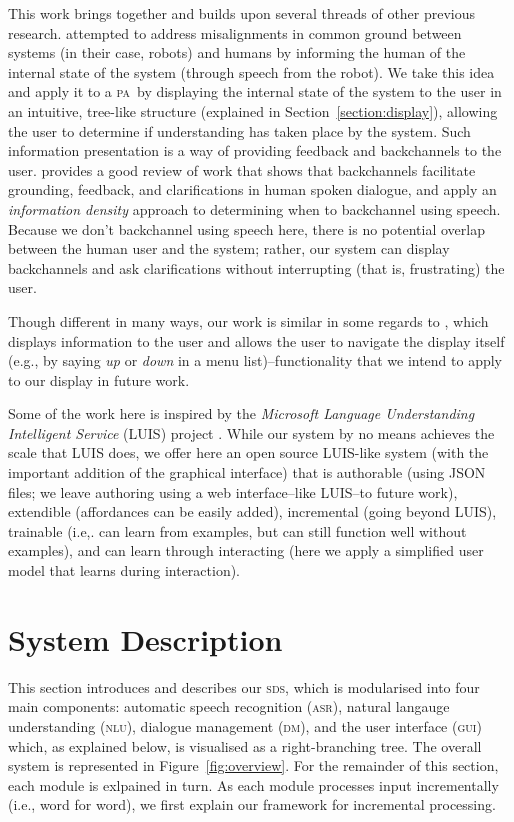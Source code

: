 \documentclass[11pt]{article}
\newcommand{\sds}[0]{\textsc{sds}}
\newcommand{\nlu}[0]{\textsc{nlu}}
\newcommand{\asr}[0]{\textsc{asr}}
\newcommand{\dm}[0]{\textsc{dm}}
\newcommand{\ui}[0]{\textsc{gui}}
\newcommand{\pa}[0]{\textsc{pa}}
\begin{document}
This work brings together and builds upon several threads of other previous research.  attempted to address misalignments in common ground \cite{clarkschaefer:contrdis} between systems (in their case, robots) and humans by informing the human of the internal state of the system (through speech from the robot). We take this idea and apply it to a \pa\ by displaying the internal state of the system to the user in an intuitive, tree-like structure (explained in Section~\ref{section:display}), allowing the user to determine if understanding has taken place by the system. Such information presentation is a way of providing feedback and backchannels to the user.  provides a good review of work that shows that backchannels facilitate grounding, feedback, and clarifications in human spoken dialogue, and apply an \emph{information density} approach to determining when to backchannel using speech. Because we don't backchannel using speech here, there is no potential overlap between the human user and the system; rather, our system can display backchannels and ask clarifications without interrupting (that is, frustrating) the user. 

Though different in many ways, our work is similar in some regards to , which displays information to the user and allows the user to navigate the display itself (e.g., by saying \emph{up} or \emph{down} in a menu list)--functionality that we intend to apply to our display in future work. 

Some of the work here is inspired by the \emph{Microsoft Language Understanding Intelligent Service} (LUIS) project \cite{Williams2015_sigdial}. While our system by no means achieves the scale that LUIS does, we offer here an open source LUIS-like system (with the important addition of the graphical interface) that is authorable (using JSON files; we leave authoring using a web interface--like LUIS--to future work), extendible (affordances can be easily added), incremental (going beyond LUIS), trainable (i.e,. can learn from examples, but can still function well without examples), and can learn through interacting (here we apply a simplified user model that learns during interaction). 

\section{System Description}
\label{section:system_def}

This section introduces and describes our \sds, which is modularised into four main components: automatic speech recognition (\asr), natural langauge understanding (\nlu), dialogue management (\dm), and the user interface (\ui) which, as explained below, is visualised as a right-branching tree. The overall system is represented in Figure~\ref{fig:overview}. For the remainder of this section, each module is exlpained in turn. As each module processes input incrementally (i.e., word for word), we first explain our framework for incremental processing.
\end{document}
